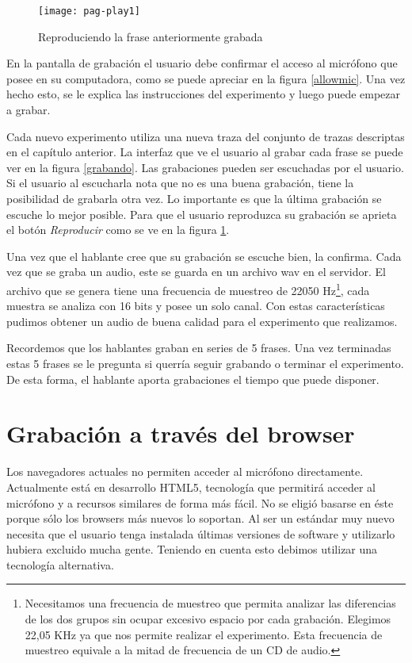 \begin{figure}[h!]
    \centerline{\texttt{[image: pag-play1]} }
    \caption{Reproduciendo la frase anteriormente grabada}
    \label{reproduciendo}
\end{figure}

En la pantalla de grabación el usuario debe confirmar el acceso al micrófono que posee en su computadora, como se puede apreciar en la figura \ref{allowmic}. Una vez hecho esto, se le explica las instrucciones del experimento y luego puede empezar a grabar. 

Cada nuevo experimento utiliza una nueva traza del conjunto de trazas descriptas en el capítulo anterior. La interfaz que ve el usuario al grabar cada frase se puede ver en la figura \ref{grabando}. Las grabaciones pueden ser escuchadas por el usuario. Si el usuario al escucharla nota que no es una buena grabación, tiene la posibilidad de grabarla otra vez. Lo importante es que la última grabación se escuche lo mejor posible. Para que el usuario reproduzca su grabación se aprieta el botón \textit{Reproducir} como se ve en la figura \ref{reproduciendo}. 

Una vez que el hablante cree que su grabación se escuche bien, la confirma. Cada vez que se graba un audio, este se guarda en un archivo wav en el servidor. El archivo que se genera tiene una frecuencia de muestreo de 22050 Hz\footnote{Necesitamos una frecuencia de muestreo que permita analizar las diferencias de los dos grupos sin ocupar excesivo espacio por cada grabación. Elegimos 22,05 KHz ya que nos permite realizar el experimento. Esta frecuencia de muestreo equivale a la mitad de frecuencia de un CD de audio. }, cada muestra se analiza con 16 bits y posee un solo canal. Con estas características pudimos obtener un audio de buena calidad para el experimento que realizamos.

Recordemos que los hablantes graban en series de 5 frases. Una vez terminadas estas 5 frases se le pregunta si querría seguir grabando o terminar el experimento. De esta forma, el hablante aporta grabaciones el tiempo que puede disponer.

\section{Grabación a través del browser}

Los navegadores actuales no permiten acceder al micrófono directamente. Actualmente está en desarrollo HTML5, tecnología que permitirá acceder al micrófono y a recursos similares de forma más fácil. No se eligió basarse en éste porque sólo los browsers más nuevos lo soportan. Al ser un estándar muy nuevo necesita que el usuario tenga instalada últimas versiones de software y utilizarlo hubiera excluido mucha gente. Teniendo en cuenta esto debimos utilizar una tecnología alternativa. 

